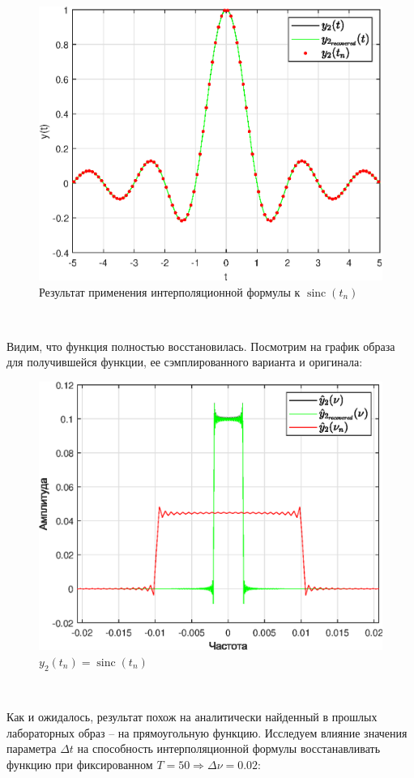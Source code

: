 \documentclass[a4paper]{article}
\begin{document}
\begin{figure}[H]
    \centering
    \includegraphics[width=0.55\linewidth]{graphs2/func2_recovered.eps}
    \caption{Результат применения интерполяционной формулы к $\operatorname{sinc}(t_n)$}
\end{figure}\ 

Видим, что функция полностью восстановилась. Посмотрим на график образа для получившейся функции, ее сэмплированного варианта и оригинала:

\begin{figure}[H]
    \centering
    \includegraphics[width=0.55\linewidth]{graphs2/func2_image.eps}
    \caption{$y_2(t_n) = \operatorname{sinc}(t_n)$}
\end{figure}\

Как и ожидалось, результат похож на аналитически найденный в прошлых лабораторных образ -- на прямоугольную функцию. Исследуем влияние значения параметра $\Delta t$ на способность интерполяционной формулы восстанавливать функцию при фиксированном $T = 50 \Rightarrow \Delta \nu = 0.02$:
\end{document}
